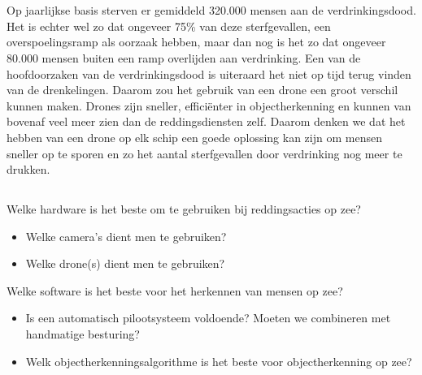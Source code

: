 
\chapter{}
\label{ch:inleiding}

\section{}
\label{sec:probleemstelling}

Op jaarlijkse basis sterven er gemiddeld 320.000 mensen aan de verdrinkingsdood. Het is echter wel zo dat ongeveer 75\% van deze sterfgevallen, een overspoelingsramp als oorzaak hebben, maar dan nog is het zo dat ongeveer 80.000 mensen buiten een ramp overlijden aan verdrinking. \autocite{WorldHealthOrganisation} Een van de hoofdoorzaken van de verdrinkingsdood is uiteraard het niet op tijd terug vinden van de drenkelingen. Daarom zou het gebruik van een drone een groot verschil kunnen maken. Drones zijn sneller, efficiënter in objectherkenning en kunnen van bovenaf veel meer zien dan de reddingsdiensten zelf. Daarom denken we dat het hebben van een drone op elk schip een goede oplossing kan zijn om mensen sneller op te sporen en zo het aantal sterfgevallen door verdrinking nog meer te drukken.

\section{}
\label{sec:onderzoeksvraag}

Welke hardware is het beste om te gebruiken bij reddingsacties op zee?

\begin{itemize}
	\item Welke camera's dient men te gebruiken?
	\item Welke drone(s) dient men te gebruiken?
\end{itemize}

Welke software is het beste voor het herkennen van mensen op zee?

\begin{itemize}
	\item Is een automatisch pilootsysteem voldoende? Moeten we combineren met handmatige besturing?
	\item Welk objectherkenningsalgorithme is het beste voor objectherkenning op zee?
\end{itemize}

